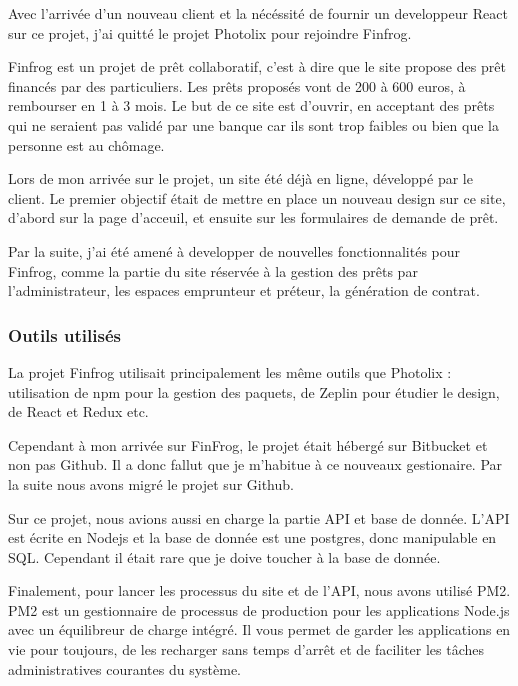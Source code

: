 \bigskip

Avec l'arrivée d'un nouveau client et la nécéssité de fournir un
developpeur React sur ce projet, j'ai quitté le projet Photolix pour
rejoindre Finfrog.

\bigskip

Finfrog est un projet de prêt collaboratif, c'est à dire que le site
propose des prêt financés par des particuliers. Les prêts proposés vont
de 200 à 600 euros, à rembourser en 1 à 3 mois. Le but de ce site est
d'ouvrir, en acceptant des prêts qui ne seraient pas validé par une
banque car ils sont trop faibles ou bien que la personne est au chômage.

\bigskip

Lors de mon arrivée sur le projet, un site été déjà en ligne, développé
par le client. Le premier objectif était de mettre en place un nouveau
design sur ce site, d'abord sur la page d'acceuil, et ensuite sur les
formulaires de demande de prêt.

\bigskip

Par la suite, j'ai été amené à developper de nouvelles fonctionnalités
pour Finfrog, comme la partie du site réservée à la gestion des prêts
par l'administrateur, les espaces emprunteur et préteur, la génération
de contrat.

\subsubsection{Outils utilisés}\label{outils-utilisuxe9s-1}

\bigskip

La projet Finfrog utilisait principalement les même outils que Photolix
: utilisation de npm pour la gestion des paquets, de Zeplin pour étudier
le design, de React et Redux etc.

\bigskip

Cependant à mon arrivée sur FinFrog, le projet était hébergé sur
Bitbucket et non pas Github. Il a donc fallut que je m'habitue à ce
nouveaux gestionaire. Par la suite nous avons migré le projet sur
Github.

\bigskip

Sur ce projet, nous avions aussi en charge la partie API et base de
donnée. L'API est écrite en Nodejs et la base de donnée est une
postgres, donc manipulable en SQL. Cependant il était rare que je doive
toucher à la base de donnée.

\bigskip

Finalement, pour lancer les processus du site et de l'API, nous avons
utilisé PM2. PM2 est un gestionnaire de processus de production pour les
applications Node.js avec un équilibreur de charge intégré. Il vous
permet de garder les applications en vie pour toujours, de les recharger
sans temps d'arrêt et de faciliter les tâches administratives courantes
du système.

